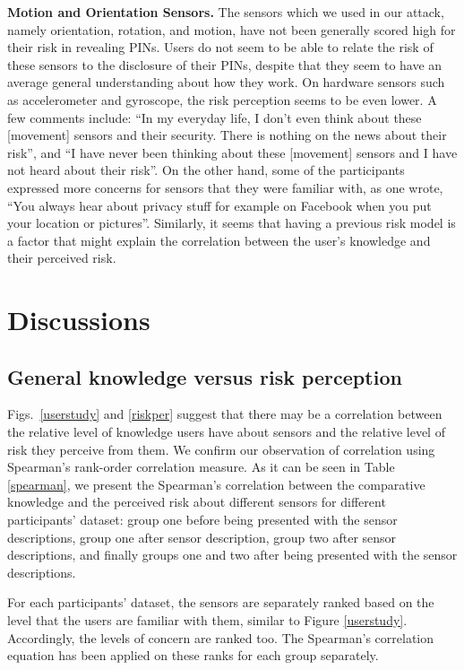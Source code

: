 \documentclass[10pt,twocolumn]{article}
\begin{document}
\textbf{Motion and Orientation Sensors.} 
The sensors which we used in our attack, namely orientation, rotation, and motion, have not been generally scored high for their risk in revealing PINs. 
Users do not seem to be able to relate the risk of these sensors to the disclosure of their PINs, despite that they seem to have an average general understanding about how they work. 
On hardware sensors such as accelerometer and gyroscope, the risk perception seems to be even lower. 
A few comments include: ``In my everyday life, I don't even think about these [movement] sensors and their security. There is nothing on the news about their risk'', and ``I have never been thinking about these [movement] sensors and I have not heard about their risk''. On the other hand, some of the participants expressed more concerns for sensors that they were familiar with, as one wrote, ``You always hear about privacy stuff for example on Facebook when you put your location or pictures''. Similarly, it seems that having a previous risk model is a factor that might explain the correlation between the user's knowledge and their perceived risk. 

\section{Discussions} 
\subsection{General knowledge versus risk perception}
Figs.~\ref{userstudy} and \ref{riskper} suggest that there may be a correlation between the relative level of knowledge users have about sensors and the relative level of risk they perceive from them. 
We confirm our observation of correlation using Spearman's rank-order correlation measure. As it can be seen in Table \ref{spearman}, we present the Spearman's correlation between the comparative knowledge and the perceived risk about different sensors for different participants' dataset: group one before being presented with the sensor descriptions, group one after sensor description, group two after sensor descriptions, and finally groups one and two after being presented with the sensor descriptions. 

For each participants' dataset, the sensors are separately ranked based on the level that the users are familiar with them, similar to Figure \ref{userstudy}. Accordingly, the levels of concern are ranked too. The Spearman's correlation equation has been applied on these ranks for each group separately. 
\end{document}

